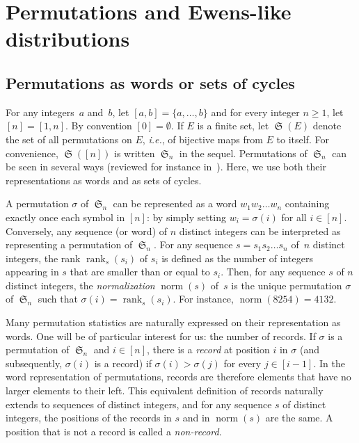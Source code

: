 \documentclass[proceedings]{aofa}
\DeclareMathOperator{\sym}{\mathfrak{S}}
\DeclareMathOperator{\norm}{norm}
\DeclareMathOperator{\rank}{rank}
\begin{document}
\section{Permutations and Ewens-like distributions}\label{sec:def}

\subsection{Permutations as words or sets of cycles}\label{sec:permutations}

For any integers~$a$ and~$b$, let $[a,b]=\{a,\ldots,b\}$ and for every integer $n\geq 1$, let $[n]=[1,n]$. 
By convention $[0]=\emptyset$. 
If $E$ is a finite set, let $\sym(E)$ denote the set of all permutations on $E$, \emph{i.e.}, of bijective maps from $E$ to itself. 
For convenience, $\sym([n])$ is written $\sym_{n}$ in the sequel. 
Permutations of $\sym_{n}$ can be seen in several ways (reviewed for instance in~\cite{Bona}). 
Here, we use both their representations as words and as sets of cycles. 

A permutation $\sigma$ of $\sym_{n}$ can be represented as a word $w_1 w_2 \ldots w_n$ containing exactly once each symbol in $[n]$: 
by simply setting $w_i = \sigma(i)$ for all $i \in [n]$. 
Conversely, any sequence (or word) of $n$ distinct integers can be interpreted as representing a permutation of $\sym_{n}$. 
For any sequence $s = s_1 s_2  \ldots s_n$ of~$n$ distinct integers, the rank $\rank_{s}(s_i)$ of $s_i$ is defined as
the number of integers appearing in $s$ that are smaller than or equal to $s_i$.
Then, for any sequence $s$ of $n$ distinct integers, the \emph{normalization} $\norm(s)$ of~$s$ is the
unique permutation $\sigma$ of $\sym_{n}$ such that $\sigma(i)=\rank_{s}(s_i)$. For instance, $\norm(8254) = 4132$.

Many permutation statistics are naturally expressed on their representation as words. 
One will be of particular interest for us: the number of records. 
If $\sigma$ is a permutation of $\sym_{n}$ and $i\in[n]$,
there is a \emph{record} at position $i$ in $\sigma$ (and subsequently, $\sigma(i)$ is a record) if $\sigma(i)>\sigma(j)$ for every $j\in [i-1]$. 
In the word representation of permutations, records are therefore elements that have no larger elements to their left. 
This equivalent definition of records naturally extends to sequences of distinct integers, and 
for any sequence $s$ of distinct integers, the positions of the records in $s$ and in $\norm(s)$ are the same. 
A position that is not a record is called a \emph{non-record}.
\end{document}
